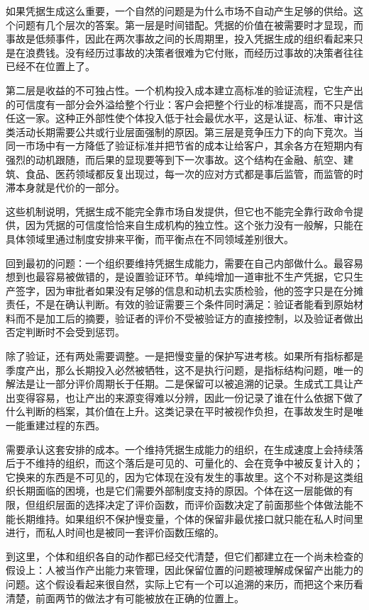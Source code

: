 如果凭据生成这么重要，一个自然的问题是为什么市场不自动产生足够的供给。这个问题有几个层次的答案。第一层是时间错配。凭据的价值在被需要时才显现，而事故是低频事件，因此在两次事故之间的长周期里，投入凭据生成的组织看起来只是在浪费钱。没有经历过事故的决策者很难为它付账，而经历过事故的决策者往往已经不在位置上了。

第二层是收益的不可独占性。一个机构投入成本建立高标准的验证流程，它生产出的可信度有一部分会外溢给整个行业：客户会把整个行业的标准提高，而不只是信任这一家。这种正外部性使个体投入低于社会最优水平，这是认证、标准、审计这类活动长期需要公共或行业层面强制的原因。第三层是竞争压力下的向下竞次。当同一市场中有一方降低了验证标准并把节省的成本让给客户，其余各方在短期内有强烈的动机跟随，而后果的显现要等到下一次事故。这个结构在金融、航空、建筑、食品、医药领域都反复出现过，每一次的应对方式都是事后监管，而监管的时滞本身就是代价的一部分。

这些机制说明，凭据生成不能完全靠市场自发提供，但它也不能完全靠行政命令提供，因为凭据的可信度恰恰来自生成机构的独立性。这个张力没有一般解，只能在具体领域里通过制度安排来平衡，而平衡点在不同领域差别很大。


回到最初的问题：一个组织要维持凭据生成能力，需要在自己内部做什么。最容易想到也最容易被做错的，是设置验证环节。单纯增加一道审批不生产凭据，它只生产签字，因为审批者如果没有足够的信息和动机去实质检验，他的签字只是在分摊责任，不是在确认判断。有效的验证需要三个条件同时满足：验证者能看到原始材料而不是加工后的摘要，验证者的评价不受被验证方的直接控制，以及验证者做出否定判断时不会受到惩罚。

除了验证，还有两处需要调整。一是把慢变量的保护写进考核。如果所有指标都是季度产出，那么长期投入必然被牺牲，这不是执行问题，是指标结构问题，唯一的解法是让一部分评价周期长于任期。二是保留可以被追溯的记录。生成式工具让产出变得容易，也让产出的来源变得难以分辨，因此一份记录了谁在什么依据下做了什么判断的档案，其价值在上升。这类记录在平时被视作负担，在事故发生时是唯一能重建过程的东西。

需要承认这套安排的成本。一个维持凭据生成能力的组织，在生成速度上会持续落后于不维持的组织，而这个落后是可见的、可量化的、会在竞争中被反复计入的；它换来的东西是不可见的，因为它体现在没有发生的事故里。这个不对称是这类组织长期面临的困境，也是它们需要外部制度支持的原因。个体在这一层能做的有限，但组织层面的选择决定了评价函数，而评价函数决定了前面那些个体做法能不能长期维持。如果组织不保护慢变量，个体的保留非最优接口就只能在私人时间里进行，而私人时间也是被同一套评价函数压缩的。

到这里，个体和组织各自的动作都已经交代清楚，但它们都建立在一个尚未检查的假设上：人被当作产出能力来管理，因此保留位置的问题被理解成保留产出能力的问题。这个假设看起来很自然，实际上它有一个可以追溯的来历，而把这个来历看清楚，前面两节的做法才有可能被放在正确的位置上。

